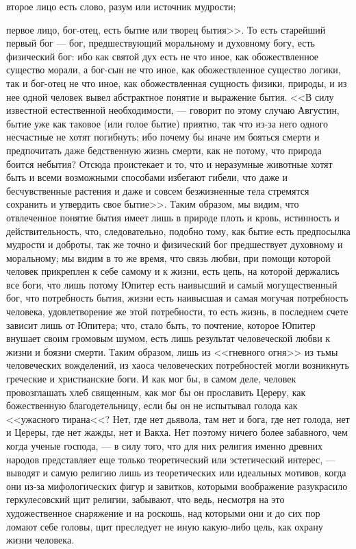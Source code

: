 \documentclass[12pt]{article}
\begin{document}
второе лицо есть слово, разум или источник мудрости; 

первое лицо, бог-отец, есть бытие или творец бытия>>. То есть старейший первый бог --- бог, предшествующий моральному и духовному богу, есть физический бог: ибо как святой дух есть не что иное, как обожествленное существо морали, а бог-сын не что иное, как обожествленное существо логики, так и бог-отец не что иное, как обожествленная сущность физики, природы, и из нее одной человек вывел абстрактное понятие и выражение бытия. <<В силу известной естественной необходимости, --- говорит по этому случаю Августин, бытие уже как таковое (или голое бытие) приятно, так что из-за него одного несчастные не хотят погибнуть; ибо почему бы иначе им бояться смерти и предпочитать даже бедственную жизнь смерти, как не потому, что природа боится небытия? Отсюда проистекает и то, что и неразумные животные хотят быть и всеми возможными способами избегают гибели, что даже и бесчувственные растения и даже и совсем безжизненные тела стремятся сохранить и утвердить свое бытие>>. Таким образом, мы видим, что отвлеченное понятие бытия имеет лишь в природе плоть и кровь, истинность и действительность, что, следовательно, подобно тому, как бытие есть предпосылка мудрости и доброты, так же точно и физический бог предшествует духовному и моральному; мы видим в то же время, что связь любви, при помощи которой человек прикреплен к себе самому и к жизни, есть цепь, на которой держались все боги, что лишь потому Юпитер есть наивысший и самый могущественный бог, что потребность бытия, жизни есть наивысшая и самая могучая потребность человека, удовлетворение же этой потребности, то есть жизнь, в последнем счете зависит лишь от Юпитера; что, стало быть, то почтение, которое Юпитер внушает своим громовым шумом, есть лишь результат человеческой любви к жизни и боязни смерти. Таким образом, лишь из <<гневного огня>>  из тьмы человеческих вожделений, из хаоса человеческих потребностей могли возникнуть греческие и христианские боги. И как мог бы, в самом деле, человек провозглашать хлеб священным, как мог бы он прославить Цереру, как божественную благодетельницу, если бы он не испытывал голода как <<ужасного тирана<<? Нет, где нет дьявола, там нет и бога, где нет голода, нет и Цереры, где нет жажды, нет и Вакха. Нет поэтому ничего более забавного, чем когда ученые господа, --- в силу того, что для них религия именно древних народов представляет еще только теоретический или эстетический интерес, --- выводят и самую религию лишь из теоретических или идеальных мотивов, когда они из-за мифологических фигур и завитков, которыми воображение разукрасило геркулесовский щит религии, забывают, что ведь, несмотря на это художественное снаряжение и на роскошь, над которыми они и до сих пор ломают себе головы, щит преследует не иную какую-либо цель, как охрану жизни человека. 
\end{document}
